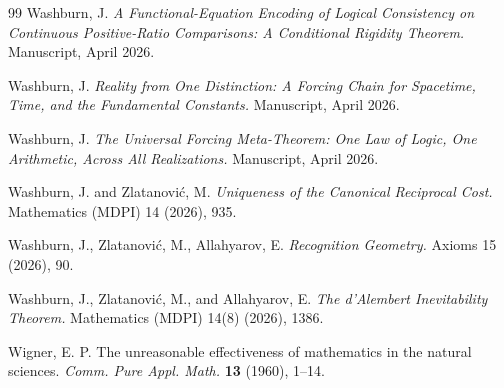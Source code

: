 \documentclass[11pt,a4paper]{article}
\theoremstyle{definition}
\theoremstyle{remark}
\begin{document}
\begin{thebibliography}{99}
Washburn, J.
\emph{A Functional-Equation Encoding of Logical Consistency on
Continuous Positive-Ratio Comparisons: A Conditional Rigidity Theorem.}
Manuscript, April 2026.

Washburn, J.
\emph{Reality from One Distinction: A Forcing Chain for Spacetime,
Time, and the Fundamental Constants.}
Manuscript, April 2026.

Washburn, J.
\emph{The Universal Forcing Meta-Theorem:
One Law of Logic, One Arithmetic, Across All Realizations.}
Manuscript, April 2026.

Washburn, J. and Zlatanovi{\'c}, M.
\emph{Uniqueness of the Canonical Reciprocal Cost.}
Mathematics (MDPI) 14 (2026), 935.

Washburn, J., Zlatanović, M., Allahyarov, E.
\emph{Recognition Geometry.}
Axioms 15 (2026), 90.

Washburn, J., Zlatanovi{\'c}, M., and Allahyarov, E.
\emph{The d'Alembert Inevitability Theorem.}
Mathematics (MDPI) 14(8) (2026), 1386.

Wigner, E. P.
The unreasonable effectiveness of mathematics in the natural sciences.
\emph{Comm. Pure Appl. Math.} \textbf{13} (1960), 1--14.

\end{thebibliography}
\end{document}
